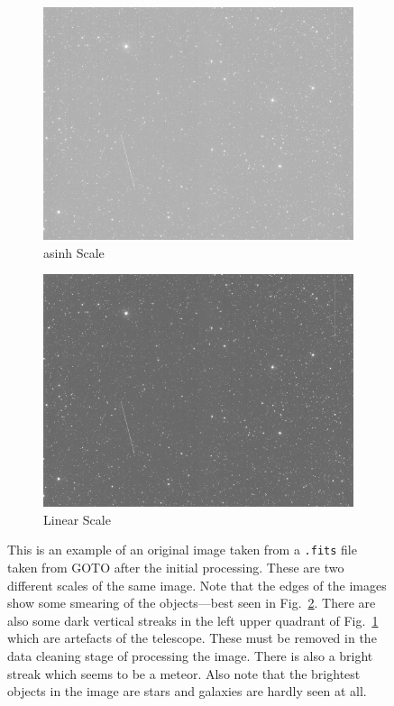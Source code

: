 \documentclass[a4paper,fleqn,usenatbib]{mnras}
\begin{document}
\begin{figure}
 \begin{subfigure}{1.6\columnwidth}
 \includegraphics[width=\columnwidth]{../Figures/pic1} 
 \caption{asinh Scale}
 \label{fig:pic1}
 \end{subfigure}
 \begin{subfigure}{1.6\columnwidth}
 \includegraphics[width=\columnwidth]{../Figures/pic4}
 \caption{Linear Scale}
 \label{fig:pic2}
 \end{subfigure}

\caption{This is an example of an original image taken from a \texttt{.fits} file taken from GOTO after the initial processing. These are two different scales of the same image. Note that the edges of the images show some smearing of the objects---best seen in Fig.~\ref{fig:pic2}. There are also some dark vertical streaks in the left upper quadrant of Fig.~\ref{fig:pic1} which are artefacts of the telescope. These must be removed in the data cleaning stage of processing the image. There is also a bright streak which seems to be a meteor. Also note that the brightest objects in the image are stars and galaxies are hardly seen at all. \label{fig:Examplefit}}
\end{figure}
\end{document}
